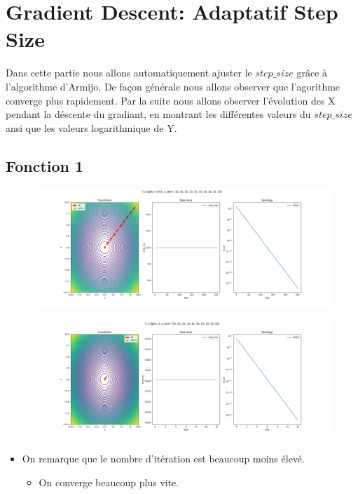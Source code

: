 \documentclass[twoside,10pt,a4paper]{article}
\numberwithin{equation}{section}					%
\numberwithin{figure}{section}						%
\begin{document}
\section{Gradient Descent: Adaptatif Step Size}\label{sec:section3}
Dans cette partie nous allons automatiquement ajuster le $step\_size$ grâce à l'algorithme d'Armijo. 
De façon générale nous allons observer que l'agorithme converge plus rapidement.
Par la suite nous allons observer l'évolution des X pendant la déscente du gradiant, en montrant les différentes valeurs du $step\_size$ ansi que les valeurs logarithmique de Y.
\subsection{Fonction 1}\label{sec:subsection2}
\begin{figure}[H]
    \centering
    \includegraphics[width=\textwidth]{imgs/adaptatif_sz/f_1_a-0.005_adaptatif.png}
    \caption{}
\end{figure}
\begin{figure}[H]
    \centering
    \includegraphics[width=\textwidth]{imgs/adaptatif_sz/f_1_a-3_adaptatif.png}
    \caption{}
\end{figure}
\begin{itemize}
	\item On remarque que le nombre d'itération est beaucoup moins élevé.
	\begin{itemize}
    	\item On converge beaucoup plus vite.
	\end{itemize}
\end{itemize}
\end{document}
